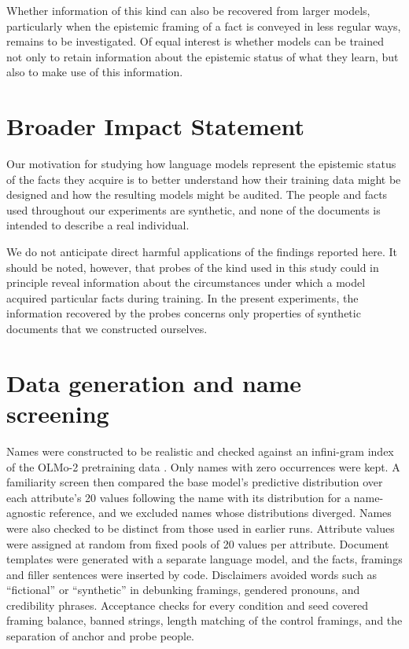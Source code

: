 \documentclass[10pt]{article}
\begin{document}
Whether information of this kind can also be recovered from larger models, particularly when the epistemic framing of a fact is conveyed in less regular ways, remains to be investigated. Of equal interest is whether models can be trained not only to retain information about the epistemic status of what they learn, but also to make use of this information.


\section*{Broader Impact Statement}

Our motivation for studying how language models represent the epistemic status of the facts they acquire is to better understand how their training data might be designed and how the resulting models might be audited. The people and facts used throughout our experiments are synthetic, and none of the documents is intended to describe a real individual.

We do not anticipate direct harmful applications of the findings reported here. It should be noted, however, that probes of the kind used in this study could in principle reveal information about the circumstances under which a model acquired particular facts during training. In the present experiments, the information recovered by the probes concerns only properties of synthetic documents that we constructed ourselves.




\appendix

\section{Data generation and name screening}
\label{app:data}
Names were constructed to be realistic and checked against an infini-gram index of the OLMo-2 pretraining data \citep{liu2024infinigramscalingunboundedn}. Only names with zero occurrences were kept. A familiarity screen then compared the base model's predictive distribution over each attribute's 20 values following the name with its distribution for a name-agnostic reference, and we excluded names whose distributions diverged. Names were also checked to be distinct from those used in earlier runs. Attribute values were assigned at random from fixed pools of 20 values per attribute. Document templates were generated with a separate language model, and the facts, framings and filler sentences were inserted by code. Disclaimers avoided words such as ``fictional'' or ``synthetic'' in debunking framings, gendered pronouns, and credibility phrases. Acceptance checks for every condition and seed covered framing balance, banned strings, length matching of the control framings, and the separation of anchor and probe people.
\end{document}
